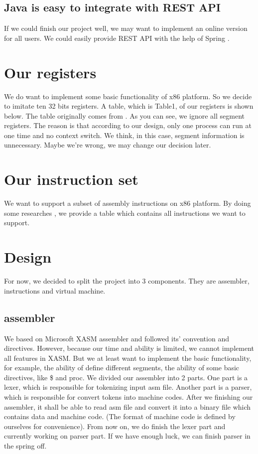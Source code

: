 \documentclass[12pt]{extarticle}
\begin{document}
        \subsection{Java is easy to integrate with REST API}
        If we could finish our project well, we may want to implement an online version for all users. We could easily provide REST API with the help of Spring \cite{walls2005spring}.
        \section{Our registers}
        We do want to implement some basic functionality of x86 platform. So we decide to imitate ten 32 bits registers. A table, which is Table1, of our registers is shown below.
        The table originally comes from \cite{kusswurm2014modern}.
        As you can see, we ignore all segment registers. The reason is that according to our design, only one process can run at one time and no context switch.
        We think, in this case, segment information is unnecessary. Maybe we're wrong, we may change our decision later.  
        \section{Our instruction set}
        We want to support a subset of assembly instructions on x86 platform. 
        By doing some researches \cite{kusswurm2014modern}, we provide a table which contains all instructions we want to support.
        \section{Design}
        For now, we decided to split the project into 3 components. They are assembler, instructions and virtual machine. 
        \subsection{assembler}
        We based on Microsoft XASM assembler and followed its' convention and directives. However, because our time and ability is limited, we cannot implement all features in XASM. 
        But we at least want to implement the basic functionality, for example, the ability of define different segments, the ability of some basic directives, like \$ and proc. 
        We divided our assembler into 2 parts. One part is a lexer, which is responsible for tokenizing input asm file. Another part is a parser, which is responsible for convert tokens into machine codes. 
        After we finishing our assembler, it shall be able to read asm file and convert it into a binary file which contains data and machine code. (The format of machine code is defined by ourselves for convenience).
        From now on, we do finish the lexer part and currently working on parser part. If we have enough luck, we can finish parser in the spring off. 
        
\end{document}
